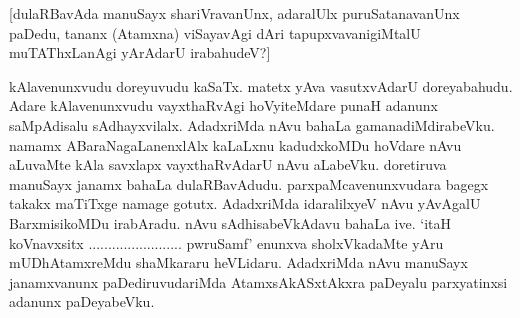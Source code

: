 [dulaRBavAda manuSayx shariVravanUnx, adaralUlx puruSatanavanUnx paDedu, tananx (Atamxna) viSayavAgi dAri tapupxvavanigiMtalU muTAThxLanAgi yArAdarU irabahudeV?]

kAlavenunxvudu doreyuvudu kaSaTx. matetx yAva vasutxvAdarU doreyabahudu. Adare kAlavenunxvudu vayxthaRvAgi hoVyiteMdare punaH adanunx saMpAdisalu sAdhayxvilalx. AdadxriMda nAvu bahaLa gamanadiMdirabeVku. namamx ABaraNagaLanenxlAlx kaLaLxnu kadudxkoMDu hoVdare nAvu aLuvaMte kAla savxlapx vayxthaRvAdarU nAvu aLabeVku. doretiruva manuSayx janamx bahaLa dulaRBavAdudu. parxpaMcavenunxvudara bagegx takakx maTiTxge namage gotutx. AdadxriMda idaralilxyeV nAvu yAvAgalU BarxmisikoMDu irabAradu. nAvu sAdhisabeVkAdavu bahaLa ive. `itaH koVnavxsitx ........................ pwruSamf' enunxva sholxVkadaMte yAru mUDhAtamxreMdu shaMkararu heVLidaru. AdadxriMda nAvu manuSayx janamxvanunx paDediruvudariMda AtamxsAkASxtAkxra paDeyalu parxyatinxsi adanunx paDeyabeVku. 

